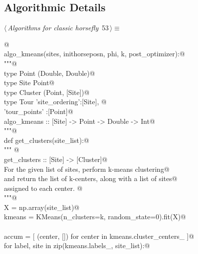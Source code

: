 \documentclass[11.5pt]{report}
\begin{document}
\subsection{Algorithmic Details}
\newchunk
\begin{flushleft} \small\label{scrap78}\raggedright\small
{} $\langle\,${\itshape Algorithms for classic horsefly}\nobreak\ {\footnotesize {53}}$\,\rangle\equiv$
\vspace{-1ex}
\begin{list}{}{} \item
\mbox{}\verb@   @\\
\mbox{}\verb@def algo_kmeans(sites, inithorseposn, phi, k, post_optimizer):@\\
\mbox{}\verb@     """@\\
\mbox{}\verb@     type Point   (Double, Double)@\\
\mbox{}\verb@     type Site    Point@\\
\mbox{}\verb@     type Cluster (Point, [Site])@\\
\mbox{}\verb@     type Tour    {'site_ordering':[Site], @\\
\mbox{}\verb@                   'tour_points'  :[Point]}@\\
\mbox{}\verb@     algo_kmeans :: [Site] -> Point -> Double -> Int@\\
\mbox{}\verb@     """@\\
\mbox{}\verb@     def get_clusters(site_list):@\\
\mbox{}\verb@           """ @\\
\mbox{}\verb@           get_clusters :: [Site] -> [Cluster]@\\
\mbox{}\verb@           For the given list of sites, perform k-means clustering@\\
\mbox{}\verb@           and return the list of k-centers, along with a list of sites@\\
\mbox{}\verb@           assigned to each center. @\\
\mbox{}\verb@           """@\\
\mbox{}\verb@           X      = np.array(site_list)@\\
\mbox{}\verb@           kmeans = KMeans(n_clusters=k, random_state=0).fit(X)@\\
\mbox{}\verb@@\\
\mbox{}\verb@           accum = [ (center, [])  for center in kmeans.cluster_centers_ ]@\\
\mbox{}\verb@           for label, site in zip(kmeans.labels_, site_list):@\\

\end{list}
\end{flushleft}
\end{document}
